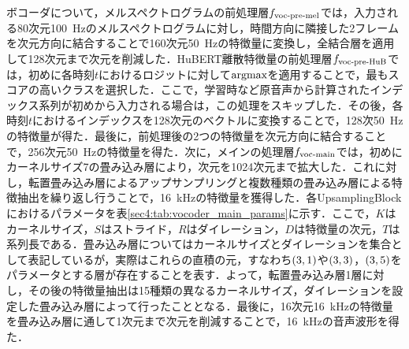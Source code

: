 ボコーダについて，メルスペクトログラムの前処理層$f_{\text{voc-pre-mel}}$では，入力される80次元\SI{100}{\Hz}のメルスペクトログラムに対し，時間方向に隣接した2フレームを次元方向に結合することで160次元\SI{50}{\Hz}の特徴量に変換し，全結合層を適用して128次元まで次元を削減した．HuBERT離散特徴量の前処理層$f_{\text{voc-pre-HuB}}$では，初めに各時刻$t$におけるロジットに対して$\text{argmax}$を適用することで，最もスコアの高いクラスを選択した．ここで，学習時など原音声から計算されたインデックス系列が初めから入力される場合は，この処理をスキップした．その後，各時刻$t$におけるインデックスを128次元のベクトルに変換することで，128次\SI{50}{\Hz}の特徴量が得た．最後に，前処理後の2つの特徴量を次元方向に結合することで，256次元\SI{50}{\Hz}の特徴量を得た．次に，メインの処理層$f_{\text{voc-main}}$では，初めにカーネルサイズ7の畳み込み層により，次元を1024次元まで拡大した．これに対し，転置畳み込み層によるアップサンプリングと複数種類の畳み込み層による特徴抽出を繰り返し行うことで，\SI{16}{\kHz}の特徴量を獲得した．各UpsamplingBlockにおけるパラメータを表\ref{sec4:tab:vocoder_main_params}に示す．ここで，$K$はカーネルサイズ，$S$はストライド，$R$はダイレーション，$D$は特徴量の次元，$T$は系列長である．畳み込み層についてはカーネルサイズとダイレーションを集合として表記しているが，実際はこれらの直積の元，すなわち$\left(3, 1\right)$や$\left(3, 3\right)$，$\left(3, 5\right)$をパラメータとする層が存在することを表す．よって，転置畳み込み層1層に対し，その後の特徴量抽出は15種類の異なるカーネルサイズ，ダイレーションを設定した畳み込み層によって行ったこととなる．最後に，16次元\SI{16}{\kHz}の特徴量を畳み込み層に通して1次元まで次元を削減することで，\SI{16}{\kHz}の音声波形を得た．
